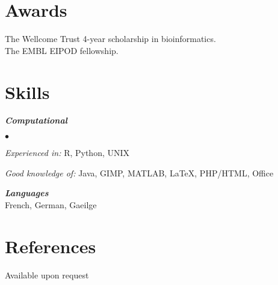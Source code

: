 \documentclass[overlapped, line, 11pt, letterpaper]{res}
\renewenvironment{itemize}{
\begin{list}{$\bullet$}
{\setlength{\itemsep}{0cm}}
}{\end{list}}
\begin{document}
\begin{resume}
\section{Awards}
The Wellcome Trust 4-year scholarship in bioinformatics. \\
The EMBL EIPOD fellowship.

\section{Skills}
\textbf{\emph{Computational}}
\begin{itemize}
\item \emph{Experienced in:} R, Python, UNIX 
\item \emph{Good knowledge of:} Java, GIMP, MATLAB, \LaTeX, PHP/HTML, Office 
\end{itemize}


\textbf{\emph{Languages}} \\
French, German, Gaeilge

\section{References}
Available upon request



\end{resume}
\end{document}
